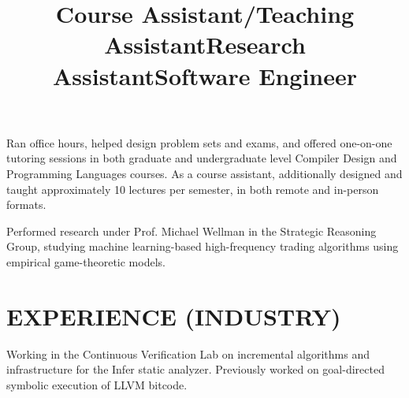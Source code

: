 \documentclass[margin]{res}
\begin{document}
\begin{resume}
\title{\textbf{Course Assistant}/\textbf{Teaching Assistant}}
\begin{position}
  Ran office hours, helped design problem sets and exams, and offered one-on-one tutoring sessions in both graduate and undergraduate level Compiler Design and Programming Languages courses.
  As a course assistant, additionally designed and taught approximately 10 lectures per semester, in both remote and in-person formats.
  \end{position}

\title{\textbf{Research Assistant}}
\begin{position}
Performed research under Prof. Michael Wellman in the Strategic Reasoning Group, studying machine learning-based high-frequency trading algorithms using empirical game-theoretic models.\end{position}
\section{EXPERIENCE (INDUSTRY)}
\title{\textbf{Software Engineer}}
\begin{position}
  Working in the Continuous Verification Lab on incremental algorithms and infrastructure for the Infer static analyzer.
  Previously worked on goal-directed symbolic execution of LLVM bitcode.
\end{position}


\end{resume}
\end{document}
